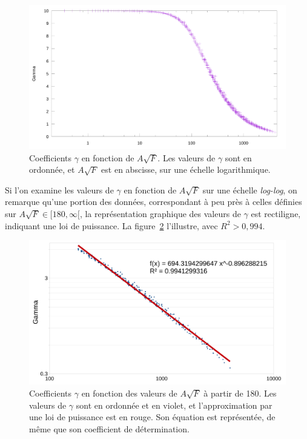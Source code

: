 	\begin{figure}[!htb]
		\centering
		\includegraphics[width=\textwidth]{figures/ch4/asqrtFVgammaLog}
		\caption[Coefficients $\gamma$ en fonction de F et A, ter (log)]{Coefficients $\gamma$ en fonction de $A\sqrt{F}$. Les valeurs de $\gamma$ sont en ordonnée, et $A\sqrt{F}$ est en abscisse, sur une échelle logarithmique.}
		\label{fig:gammaASQRTFlog}
	\end{figure}
	
	Si l'on examine les valeurs de $\gamma$ en fonction de $A\sqrt{F}$ sur une échelle \emph{log-log}, on remarque qu'une portion des données, correspondant à peu près à celles définies sur $A\sqrt{F} \in [180,\infty[$, la représentation graphique des valeurs de $\gamma$ est rectiligne, indiquant une loi de puissance. La figure~\ref{fig:powerLawFit} l'illustre, avec $R^{2} > 0,994$.
	
	\begin{figure}[!htb]
		\centering
		\includegraphics[width=\textwidth]{figures/ch4/powerLawFit}
		\caption[Coefficients $\gamma$ en fonction de F et A, quater (log-log)]{Coefficients $\gamma$ en fonction des valeurs de $A\sqrt{F}$ à partir de 180. Les valeurs de $\gamma$ sont en ordonnée et en violet, et l'approximation par une loi de puissance est en rouge. Son équation est représentée, de même que son coefficient de détermination.}
		\label{fig:powerLawFit}
	\end{figure}
	
